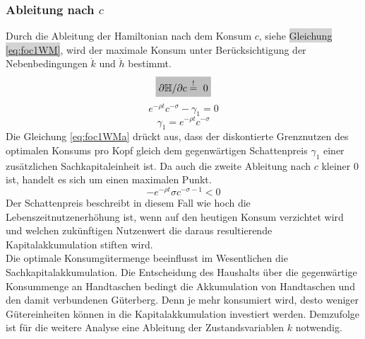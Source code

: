 \subsubsection*{Ableitung nach $c$}
Durch die Ableitung der Hamiltonian nach dem Konsum $c$, siehe \colorbox{lightgray}{Gleichung \eqref{eq:foc1WM}}, wird der maximale Konsum unter Berücksichtigung der Nebenbedingungen $\dot{k}$ und $\dot{h}$ bestimmt.
%
\begin{equation}
	\colorbox{lightgray}{$\partial\mathbb{H}/\partial c\overset{!}{=}~0$}
\end{equation}
%
\vspace{-0.5cm}
%
\begin{equation}
	e^{-\rho t}c^{-\sigma}-\gamma_1 = 0
\end{equation}
%
\vspace{-0.7cm}
%
\begin{equation}
	\gamma_1=e^{-\rho t}c^{-\sigma}
	\label{eq:foc1WMa}
\end{equation}
%
Die Gleichung \eqref{eq:foc1WMa} drückt aus, dass der diskontierte Grenznutzen des optimalen Konsums pro Kopf gleich dem gegenwärtigen Schattenpreis $\gamma_1$ einer zusätzlichen Sachkapitaleinheit ist. Da auch die zweite Ableitung nach $c$ kleiner $0$ ist, handelt es sich um einen maximalen Punkt. 
%
\begin{equation}
	-e^{-\rho t}\sigma c^{-\sigma-1}<0
\end{equation}
%
Der Schattenpreis beschreibt in diesem Fall wie hoch die Lebenszeitnutzenerhöhung ist, wenn auf den heutigen Konsum verzichtet wird und welchen zukünftigen Nutzenwert die  daraus resultierende Kapitalakkumulation stiften wird.\\
%
Die optimale Konsumgütermenge beeinflusst im Wesentlichen die Sachkapitalakkumulation. Die Entscheidung des Haushalts über die gegenwärtige Konsummenge an Handtaschen bedingt die Akkumulation von Handtaschen und den damit verbundenen Güterberg. Denn je mehr konsumiert wird, desto weniger Gütereinheiten können in die Kapitalakkumulation investiert werden. Demzufolge ist für die weitere Analyse eine Ableitung der Zustandsvariablen $k$ notwendig.
% 

